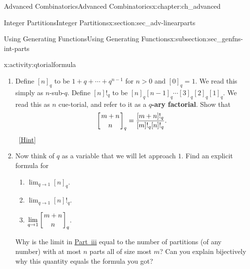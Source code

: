 \documentclass[oneside,10pt,]{book}
\newcommand{\terminology}[1]{\textbf{#1}}
\numberwithin{equation}{chapter}
\newcommand{\qchoose}[2]{\left[{#1\atop#2}\right]_q}
\begin{document}
\begin{chapterptx}{Advanced Combinatorics}{}{Advanced Combinatorics}{}{}{x:chapter:ch_advanced}
\begin{sectionptx}{Integer Partitions}{}{Integer Partitions}{}{}{x:section:sec_adv-linearparts}
\begin{subsectionptx}{Using Generating Functions}{}{Using Generating Functions}{}{}{x:subsection:sec_genfns-int-parts}
\begin{activity}{}{x:activity:qtorialformula}
\begin{enumerate}[font=\bfseries,label=(\alph*),ref=\alph*]
\begin{enumerate}[font=\bfseries,label=(\roman*),ref=\theenumi.\roman*]
\item{}The largest part of a partition counted by \(\qchoose{m+n}{n}\) is either \(m\) or is less than or equal to \(m-1\).  In the second case, the partition fits into a rectangle that is at most \(m-1\) units wide and at most \(n\) units deep.  What is the generating function for partitions of this type?  In the first case, what kind of rectangle does the partition we get by removing the largest part sit in?  What is the generating function for partitions that sit in this kind of rectangle?  What is the generating function for partitions that sit in this kind of rectangle after we remove a largest part of size \(m\)?  What recurrence relation does this give you?%
\item{}What recurrence do you get from the other operation we studied in \hyperref[x:activity:numberpartitionrecurrence]{Activity~\ref{x:activity:numberpartitionrecurrence}}?%
\item{}It is quite likely that the two recurrences you got are different.  One would expect that they might give different values for \(\qchoose{m+n}{n}\).  Can you resolve this potential conflict?%
\qquad~\hfill{\tiny\hyperlink{g:hint:idm8436-back}{[Hint]}}\end{enumerate}
\item{}Define \([n]_q\) to be \(1+q+\cdots+q^{n-1}\) for \(n>0\) and \([0]_q =1\).  We read this simply as \(n\)-sub-\(q\). Define \([n]!_q\) to be \([n]_q[n-1]_q\cdots [3]_q[2]_q[1]_q\). We read this as \(n\) cue-torial, and refer to it as a \terminology{\(q\)-ary factorial}. Show that%
\begin{equation*}
\qchoose{m+n}{n} = \frac{[m+n]!_q}{[m]!_q[n]!_q}.
\end{equation*}
%
\qquad~\hfill{\tiny\hyperlink{g:hint:idm8462-back}{[Hint]}}\item{}Now think of \(q\) as a variable that we will let approach \(1\). Find an explicit formula for%
\begin{enumerate}[label=(\roman*)]
\item{}\(\displaystyle\lim_{q\rightarrow 1} [n]_q\).%
\item{}\(\displaystyle\lim_{q\rightarrow 1} [n]!_q\).%
\item\hypertarget{x:li:q-binomial-lim}{}\(\displaystyle\lim_{q\rightarrow 1} \qchoose{m+n}{n}\).%
\end{enumerate}
Why is the limit in \hyperlink{x:li:q-binomial-lim}{Part~iii} equal to the number of partitions (of any number) with at most \(n\) parts all of size most \(m\)? Can you explain bijectively why this quantity equals the formula you got?%

\end{enumerate}
\end{activity}
\end{subsectionptx}
\end{sectionptx}
\end{chapterptx}
\end{document}

